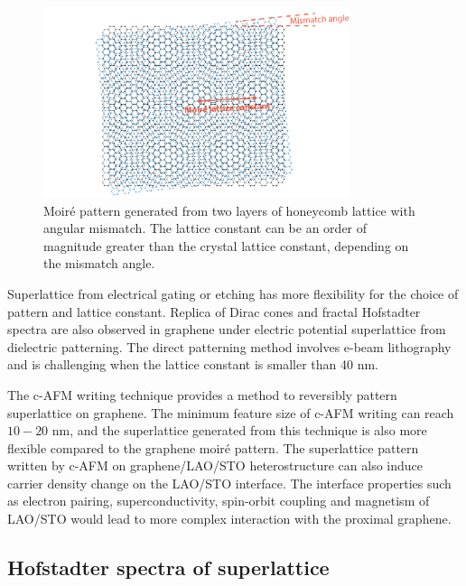\documentclass[pdflatex, sectionletters, 12pt]{pittetd}    %
\begin{document}
\begin{figure}[h!]
	\centering
	\includegraphics[width=0.8\textwidth]{Drawing/Moire.pdf}
	\caption{Moir{\'e} pattern generated from two layers of honeycomb lattice with angular mismatch. The lattice constant can be an order of magnitude greater than the crystal lattice constant, depending on the mismatch angle.}
	\label{FIG:Moire}
\end{figure}

Superlattice from electrical gating\cite{forsythe2018band} or etching\cite{jessen2019lithographic} has more flexibility for the choice of pattern and lattice constant. Replica of Dirac cones and fractal Hofstadter spectra are also observed in graphene under electric potential superlattice from dielectric patterning\cite{forsythe2018band}. The direct patterning method involves e-beam lithography and is challenging when the lattice constant is smaller than 40 nm.

The c-AFM writing technique provides a method to reversibly pattern superlattice on graphene. The minimum feature size of c-AFM writing can reach $10-20$ nm\cite{huang2015electric}, and the superlattice generated from this technique is also more flexible compared to the graphene moir{\'e} pattern. The superlattice pattern written by c-AFM on graphene/LAO/STO heterostructure can also induce carrier density change on the LAO/STO interface\cite{huang2015electric}. The interface properties such as electron pairing\cite{cheng2015electron}, superconductivity\cite{reyren2007superconducting}, spin-orbit coupling\cite{caviglia2010tunable, zhong2013theory} and magnetism\cite{bi2014room} of LAO/STO would lead to more complex interaction with the proximal graphene.

\subsection{Hofstadter spectra of superlattice}
\end{document}
